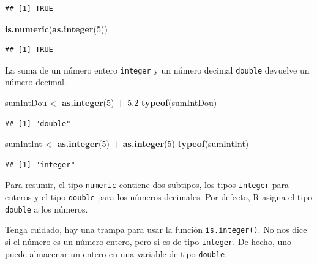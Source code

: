 \documentclass[
]{book}
\newenvironment{Shaded}{\begin{snugshade}}{\end{snugshade}}
\newcommand{\DecValTok}[1]{\textcolor[rgb]{0.00,0.00,0.81}{#1}}
\newcommand{\FloatTok}[1]{\textcolor[rgb]{0.00,0.00,0.81}{#1}}
\newcommand{\KeywordTok}[1]{\textcolor[rgb]{0.13,0.29,0.53}{\textbf{#1}}}
\newcommand{\NormalTok}[1]{#1}
\newcommand{\OperatorTok}[1]{\textcolor[rgb]{0.81,0.36,0.00}{\textbf{#1}}}
\newcommand{\StringTok}[1]{\textcolor[rgb]{0.31,0.60,0.02}{#1}}
\begin{document}
\begin{verbatim}
## [1] TRUE
\end{verbatim}

\begin{Shaded}
\begin{Highlighting}[]
\KeywordTok{is.numeric}\NormalTok{(}\KeywordTok{as.integer}\NormalTok{(}\DecValTok{5}\NormalTok{))}
\end{Highlighting}
\end{Shaded}

\begin{verbatim}
## [1] TRUE
\end{verbatim}

La suma de un número entero \texttt{integer} y un número decimal \texttt{double} devuelve un número decimal.

\begin{Shaded}
\begin{Highlighting}[]
\NormalTok{sumIntDou <-}\StringTok{ }\KeywordTok{as.integer}\NormalTok{(}\DecValTok{5}\NormalTok{) }\OperatorTok{+}\StringTok{ }\FloatTok{5.2}
\KeywordTok{typeof}\NormalTok{(sumIntDou)}
\end{Highlighting}
\end{Shaded}

\begin{verbatim}
## [1] "double"
\end{verbatim}

\begin{Shaded}
\begin{Highlighting}[]
\NormalTok{sumIntInt <-}\StringTok{ }\KeywordTok{as.integer}\NormalTok{(}\DecValTok{5}\NormalTok{) }\OperatorTok{+}\StringTok{ }\KeywordTok{as.integer}\NormalTok{(}\DecValTok{5}\NormalTok{)}
\KeywordTok{typeof}\NormalTok{(sumIntInt)}
\end{Highlighting}
\end{Shaded}

\begin{verbatim}
## [1] "integer"
\end{verbatim}

Para resumir, el tipo \texttt{numeric} contiene dos subtipos, los tipos \texttt{integer} para enteros y el tipo \texttt{double} para los números decimales. Por defecto, R asigna el tipo \texttt{double} a los números.

Tenga cuidado, hay una trampa para usar la función \texttt{is.integer()}. No nos dice si el número es un número entero, pero si es de tipo \texttt{integer}. De hecho, uno puede almacenar un entero en una variable de tipo \texttt{double}.
\end{document}
